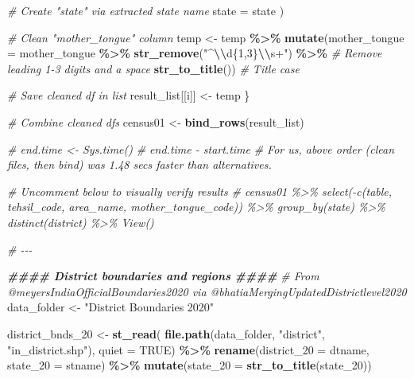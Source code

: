 \documentclass[
]{article}
\newenvironment{Shaded}{\begin{snugshade}}{\end{snugshade}}
\newcommand{\AttributeTok}[1]{\textcolor[rgb]{0.13,0.29,0.53}{#1}}
\newcommand{\CommentTok}[1]{\textcolor[rgb]{0.56,0.35,0.01}{\textit{#1}}}
\newcommand{\ConstantTok}[1]{\textcolor[rgb]{0.56,0.35,0.01}{#1}}
\newcommand{\DocumentationTok}[1]{\textcolor[rgb]{0.56,0.35,0.01}{\textbf{\textit{#1}}}}
\newcommand{\FunctionTok}[1]{\textcolor[rgb]{0.13,0.29,0.53}{\textbf{#1}}}
\newcommand{\NormalTok}[1]{#1}
\newcommand{\OtherTok}[1]{\textcolor[rgb]{0.56,0.35,0.01}{#1}}
\newcommand{\SpecialCharTok}[1]{\textcolor[rgb]{0.81,0.36,0.00}{\textbf{#1}}}
\newcommand{\StringTok}[1]{\textcolor[rgb]{0.31,0.60,0.02}{#1}}
\begin{document}
\begin{Shaded}
\begin{Highlighting}[]
      \CommentTok{\# Create "state" via extracted state name}
      \AttributeTok{state =}\NormalTok{ state}
\NormalTok{    )}
  
  \CommentTok{\# Clean "mother\_tongue" column}
\NormalTok{  temp }\OtherTok{\textless{}{-}}\NormalTok{ temp }\SpecialCharTok{\%\textgreater{}\%} 
    \FunctionTok{mutate}\NormalTok{(}\AttributeTok{mother\_tongue =}\NormalTok{ mother\_tongue }\SpecialCharTok{\%\textgreater{}\%} 
             \FunctionTok{str\_remove}\NormalTok{(}\StringTok{"\^{}}\SpecialCharTok{\textbackslash{}\textbackslash{}}\StringTok{d\{1,3\}}\SpecialCharTok{\textbackslash{}\textbackslash{}}\StringTok{s+"}\NormalTok{) }\SpecialCharTok{\%\textgreater{}\%} \CommentTok{\# Remove leading 1{-}3 digits and a space}
             \FunctionTok{str\_to\_title}\NormalTok{()) }\CommentTok{\# Title case}
  
  \CommentTok{\# Save cleaned df in list}
\NormalTok{  result\_list[[i]] }\OtherTok{\textless{}{-}}\NormalTok{ temp}
\NormalTok{\}}

\CommentTok{\# Combine cleaned dfs}
\NormalTok{census01 }\OtherTok{\textless{}{-}} \FunctionTok{bind\_rows}\NormalTok{(result\_list)}

\CommentTok{\# end.time \textless{}{-} Sys.time()}
\CommentTok{\# end.time {-} start.time }
\CommentTok{\# For us, above order (clean files, then bind) was 1.48 secs faster than alternatives.}

\CommentTok{\# Uncomment below to visually verify results}
\CommentTok{\# census01 \%\textgreater{}\% select({-}c(table, tehsil\_code, area\_name, mother\_tongue\_code)) \%\textgreater{}\% group\_by(state) \%\textgreater{}\% distinct(district) \%\textgreater{}\% View()}


\CommentTok{\# {-}{-}{-}}

\DocumentationTok{\#\#\#\# District boundaries and regions \#\#\#\#}
\CommentTok{\# From @meyersIndiaOfficialBoundaries2020 via @bhatiaMergingUpdatedDistrictlevel2020 }
\NormalTok{data\_folder }\OtherTok{\textless{}{-}} \StringTok{"District Boundaries 2020"}

\NormalTok{district\_bnds\_20 }\OtherTok{\textless{}{-}} \FunctionTok{st\_read}\NormalTok{(}
  \FunctionTok{file.path}\NormalTok{(data\_folder, }\StringTok{"district"}\NormalTok{, }\StringTok{"in\_district.shp"}\NormalTok{), }
  \AttributeTok{quiet =} \ConstantTok{TRUE}\NormalTok{) }\SpecialCharTok{\%\textgreater{}\%} 
  \FunctionTok{rename}\NormalTok{(}\AttributeTok{district\_20 =}\NormalTok{ dtname, }
         \AttributeTok{state\_20 =}\NormalTok{ stname) }\SpecialCharTok{\%\textgreater{}\%} 
  \FunctionTok{mutate}\NormalTok{(}\AttributeTok{state\_20 =} \FunctionTok{str\_to\_title}\NormalTok{(state\_20))}








\end{Highlighting}
\end{Shaded}
\end{document}
